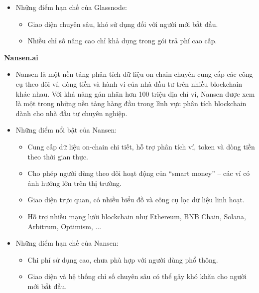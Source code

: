 \documentclass{article}[14pt]
\begin{document}
{    \begin{itemize}
        \item Những điểm hạn chế của Glassnode:
        \begin{itemize}
            \item Giao diện chuyên sâu, khó sử dụng đối với người mới bắt đầu.
            \item Nhiều chỉ số nâng cao chỉ khả dụng trong gói trả phí cao cấp.
        \end{itemize}
    \end{itemize}

    \textbf{Nansen.ai} \cite{nansenai}
    
    \begin{itemize}
    \item Nansen là một nền tảng phân tích dữ liệu on-chain chuyên cung cấp các công cụ theo dõi ví, dòng tiền và hành vi của nhà đầu tư trên nhiều blockchain khác nhau. Với khả năng gán nhãn hơn 100 triệu địa chỉ ví, Nansen được xem là một trong những nền tảng hàng đầu trong lĩnh vực phân tích blockchain dành cho nhà đầu tư chuyên nghiệp.

    \item Những điểm nổi bật của Nansen:
        \begin{itemize}
            \item Cung cấp dữ liệu on-chain chi tiết, hỗ trợ phân tích ví, token và dòng tiền theo thời gian thực.
            \item Cho phép người dùng theo dõi hoạt động của “smart money” – các ví có ảnh hưởng lớn trên thị trường.
            \item Giao diện trực quan, có nhiều biểu đồ và công cụ lọc dữ liệu linh hoạt.
            \item Hỗ trợ nhiều mạng lưới blockchain như Ethereum, BNB Chain, Solana, Arbitrum, Optimism, ...
        \end{itemize}
    \end{itemize}
    
        \begin{itemize}
        \item Những điểm hạn chế của Nansen:
        \begin{itemize}
        \item Chi phí sử dụng cao, chưa phù hợp với người dùng phổ thông.
        \item Giao diện và hệ thống chỉ số chuyên sâu có thể gây khó khăn cho người mới bắt đầu.
    \end{itemize}
    \end{itemize}

}
\end{document}
